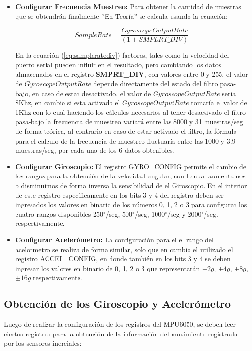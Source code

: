 \documentclass[12pt,a4paper]{article}
\newcommand{\grad}{$^{\circ}$}
\begin{document}
\begin{itemize}
\item \textbf{Configurar Frecuencia Muestreo:} Para obtener la cantidad de muestras que se obtendrán finalmente ``En Teoría'' se calcula usando la ecuación: 

\begin{equation} 
\label{eq:sampleratediv}
Sample Rate = \frac{Gyroscope Output Rate}{(1 + SMPLRT\_DIV) }
\end{equation}

En la ecuación (\ref{eq:sampleratediv}) factores, tales como la velocidad del puerto serial pueden influir en el resultado, pero cambiando los datos almacenados en el registro \textbf{SMPRT\_DIV}, con valores entre 0 y 255, el valor de $Gyroscope Output Rate$ depende directamente del estado del filtro pasa-bajo, en caso de estar desactivado, el valor de $Gyroscope Output Rate$ seria 8Khz, en cambio si esta activado el $Gyroscope Output Rate$ tomaría el valor de 1Khz con lo cual haciendo los cálculos necesarios al tener desactivado el filtro pasa-bajo la frecuencia de muestreo variará entre las 8000 y 31 muestras/seg de forma teórica, al contrario en caso de estar activado el filtro, la fórmula para el calculo de la frecuencia de muestreo fluctuaría entre las 1000 y 3.9 muestras/seg, por cada uno de los 6 datos obtenibles.

\item \textbf{Configurar Giroscopio:} El registro GYRO\_CONFIG permite el cambio de los rangos para la obtención de la velocidad angular, con lo cual aumentamos o disminuimos de forma inversa la sensibilidad de el Giroscopio. En el interior de este registro específicamente en los bits 3 y 4 del registro deben ser ingresados los valores en binario de los números 0, 1, 2 o 3 para configurar los cuatro rangos disponibles 250\grad/seg, 500\grad/seg, 1000\grad/seg y 2000\grad/seg. respectivamente.

\item \textbf{Configurar Acelerómetro:} La configuración para el el rango del acelormetro se realiza de forma similar, solo que en cambio el utilizado el registro ACCEL\_CONFIG, en donde también en los bits 3 y 4 se deben ingresar los valores en binario de 0, 1, 2 o 3 que representarán $\pm 2g$, $\pm 4g$, $\pm 8g$, $\pm 16g$ respectivamente.

\end{itemize}

\subsection{Obtención de los Giroscopio y Acelerómetro}
Luego de realizar la configuración de los registros del MPU6050, se deben leer ciertos registros para la obtención de la información del movimiento registrado por los sensores inerciales:
\end{document}
